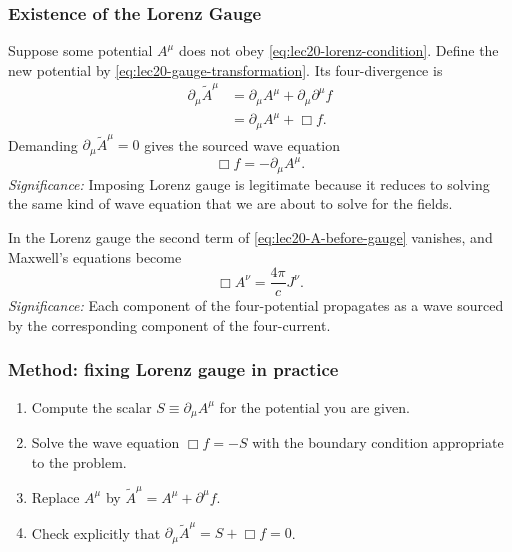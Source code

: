 \subsubsection*{Existence of the Lorenz Gauge}
Suppose some potential $A^\mu$ does not obey \eqref{eq:lec20-lorenz-condition}. Define the
new potential by \eqref{eq:lec20-gauge-transformation}. Its four-divergence is
\begin{align*}
  \partial_\mu\widetilde A^\mu
  &=\partial_\mu A^\mu+\partial_\mu\partial^\mu f \\
  &=\partial_\mu A^\mu+\Box f.
\end{align*}
Demanding $\partial_\mu\widetilde A^\mu=0$ gives the sourced wave equation
\begin{equation}\label{eq:lec20-gauge-f-equation}
  \boxed{\Box f=-\partial_\mu A^\mu.}
\end{equation}
\textit{Significance:} Imposing Lorenz gauge is legitimate because it reduces to solving the same kind of wave equation that we are about to solve for the fields.

In the Lorenz gauge the second term of \eqref{eq:lec20-A-before-gauge} vanishes, and
Maxwell's equations become
\begin{equation}\label{eq:lec20-wave-A}
  \boxed{\Box A^\nu=\frac{4\pi}{c}J^\nu.}
\end{equation}
\textit{Significance:} Each component of the four-potential propagates as a wave sourced by the corresponding component of the four-current.


\subsubsection*{Method: fixing Lorenz gauge in practice}
\begin{enumerate}
  \item Compute the scalar $S\equiv\partial_\mu A^\mu$ for the potential you are given.
  \item Solve the wave equation $\Box f=-S$ with the boundary condition appropriate to the problem.
  \item Replace $A^\mu$ by $\widetilde A^\mu=A^\mu+\partial^\mu f$.
  \item Check explicitly that $\partial_\mu\widetilde A^\mu=S+\Box f=0$.
\end{enumerate}

